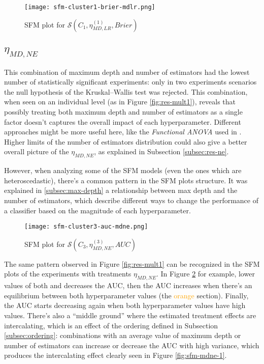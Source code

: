 \begin{figure}[H]
    \centering
    \texttt{[image: sfm-cluster1-brier-mdlr.png]}
    \caption{SFM plot for $\mathcal{S}(C_1, \eta^{(1)}_{MD, LR}, Brier)$}
    \label{fig:sfm-mdlr-2}
\end{figure}

\subsection{\texorpdfstring{\Large$\eta_{MD, NE}$}{}}

This combination of maximum depth and number of estimators had the lowest number of statistically significant experiments: only in two experiments scenarios the null hypothesis of the Kruskal–Wallis test was rejected. This combination, when seen on an individual level (as in Figure \ref{fig:res-mult1}), reveals that possibly treating both maximum depth and number of estimators as a single factor doesn't captures the overall impact of each hyperparameter. Different approaches might be more useful here, like the \textit{Functional ANOVA} used in \cite{van2018hyperparameter}. Higher limits of the number of estimators distribution could also give a better overall picture of the $\eta_{MD, NE}$, as explained in Subsection \ref{subsec:res-ne}.

However, when analyzing some of the SFM models (even the ones which are heteroscedastic), there's a common pattern in the SFM plots structure. It was explained in \ref{subsec:max-depth} a relationship between max depth and the number of estimators, which describe different ways to change the performance of a classifier based on the magnitude of each hyperparameter.

\begin{figure}[H]
    \centering
    \texttt{[image: sfm-cluster3-auc-mdne.png]}
    \caption{SFM plot for $\mathcal{S}(C_3, \eta^{(3)}_{MD, NE}, AUC)$}
    \label{fig:sfm-mdne-2}
\end{figure}

The same pattern observed in Figure \ref{fig:res-mult1} can be recognized in the SFM plots of the experiments with treatments $\eta_{MD, NE}$. In Figure \ref{fig:sfm-mdne-2} for example, lower values of both  and  decreases the AUC, then the AUC increases when there's an equilibrium between both hyperparameter values (the  \textcolor{orange}{orange} section). Finally, the AUC starts decreasing again when both hyperparameter values have high values. There's also a ``middle ground'' where the estimated treatment effects are intercalating, which is an effect of the ordering defined in Subsection \ref{subsec:ordering}: combinations with an average value of maximum depth or number of estimators can increase or decrease the AUC with high variance, which produces the intercalating effect clearly seen in Figure \ref{fig:sfm-mdne-1}.

